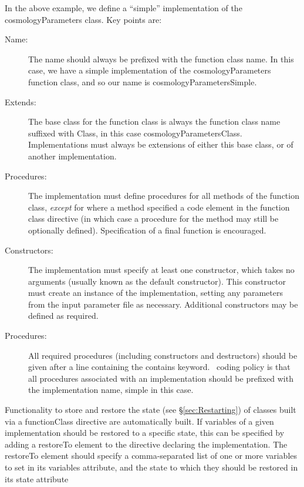 In the above example, we define a ``simple'' implementation of the {\normalfont cosmologyParameters} class. Key points are:
\begin{description}
\item[Name:] The name should always be prefixed with the function class name. In this case, we have a {\normalfont \ttfamily simple} implementation of the {\normalfont \ttfamily cosmologyParameters} function class, and so our name is {\normalfont \ttfamily cosmologyParametersSimple}.
\item[Extends:] The base class for the function class is always the function class name suffixed with {\normalfont \ttfamily Class}, in this case {\normalfont \ttfamily cosmologyParametersClass}. Implementations must always be extensions of either this base class, or of another implementation.
\item[Procedures:] The implementation must define procedures for all methods of the function class, \emph{except} for where a method specified a {\normalfont \ttfamily code} element in the function class directive (in which case a procedure for the method may still be optionally defined). Specification of a {\normalfont \ttfamily final} function is encouraged.
\item[Constructors:] The implementation must specify at least one constructor, which takes no arguments (usually known as the default constructor). This constructor must create an instance of the implementation, setting any parameters from the input parameter file as necessary. Additional constructors may be defined as required.
\item[Procedures:] All required procedures (including constructors and destructors) should be given after a line containing the {\normalfont \ttfamily contains} keyword. \glc\ coding policy is that all procedures associated with an implementation should be prefixed with the implementation name, {\normalfont \ttfamily simple} in this case.
\end{description}

Functionality to store and restore the state (see \S\ref{sec:Restarting}) of classes built via a {\normalfont \ttfamily functionClass} directive are automatically built. If variables of a given implementation should be restored to a specific state, this can be specified by adding a {\normalfont \ttfamily restoreTo} element to the directive declaring the implementation. The {\normalfont \ttfamily restoreTo} element should specify a comma-separated list of one or more variables to set in its {\normalfont \ttfamily variables} attribute, and the state to which they should be restored in its {\normalfont \ttfamily state} attribute

